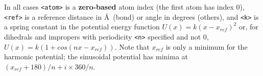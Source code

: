 In all cases {\tt <atom>} is a {\bf zero-based} atom index
(the first atom has index 0),
{\tt <ref>} is a reference distance in \AA\ (bond) or angle in degrees (others),
and {\tt <k>} is a spring constant in the potential energy function
$U(x) = k (x-x_{ref})^2$ or, for dihedrals and impropers with 
periodicity {\tt <n>} specified and not 0, $U(x) = k (1 + cos(n x - x_{ref}))$.
Note that $x_{ref}$ is only a minimum for the harmonic potential;
the sinusoidal potential has minima at $(x_{ref} + 180)/n + i \times 360/n$.



